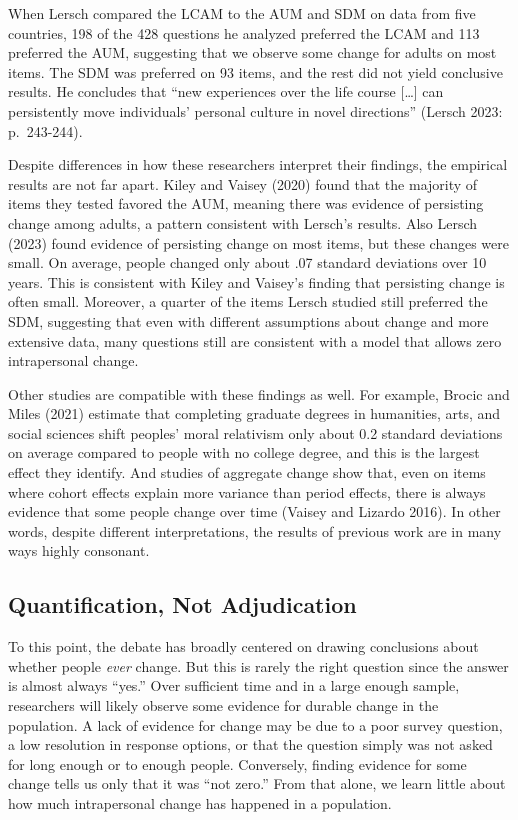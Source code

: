\documentclass[
  12pt,
]{article}
\begin{document}
When Lersch compared the LCAM to the AUM and SDM on data from five
countries, 198 of the 428 questions he analyzed preferred the LCAM and
113 preferred the AUM, suggesting that we observe some change for adults
on most items. The SDM was preferred on 93 items, and the rest did not
yield conclusive results. He concludes that ``new experiences over the
life course {[}\ldots{]} can persistently move individuals' personal
culture in novel directions'' (Lersch 2023: p.~243-244).

Despite differences in how these researchers interpret their findings,
the empirical results are not far apart. Kiley and Vaisey (2020) found
that the majority of items they tested favored the AUM, meaning there
was evidence of persisting change among adults, a pattern consistent
with Lersch's results. Also Lersch (2023) found evidence of persisting
change on most items, but these changes were small. On average, people
changed only about .07 standard deviations over 10 years. This is
consistent with Kiley and Vaisey's finding that persisting change is
often small. Moreover, a quarter of the items Lersch studied still
preferred the SDM, suggesting that even with different assumptions about
change and more extensive data, many questions still are consistent with
a model that allows zero intrapersonal change.

Other studies are compatible with these findings as well. For example,
Brocic and Miles (2021) estimate that completing graduate degrees in
humanities, arts, and social sciences shift peoples' moral relativism
only about 0.2 standard deviations on average compared to people with no
college degree, and this is the largest effect they identify. And
studies of aggregate change show that, even on items where cohort
effects explain more variance than period effects, there is always
evidence that some people change over time (Vaisey and Lizardo 2016). In
other words, despite different interpretations, the results of previous
work are in many ways highly consonant.

\hypertarget{quantification-not-adjudication}{%
\subsection{Quantification, Not
Adjudication}\label{quantification-not-adjudication}}

To this point, the debate has broadly centered on drawing conclusions
about whether people \emph{ever} change. But this is rarely the right
question since the answer is almost always ``yes.'' Over sufficient time
and in a large enough sample, researchers will likely observe some
evidence for durable change in the population. A lack of evidence for
change may be due to a poor survey question, a low resolution in
response options, or that the question simply was not asked for long
enough or to enough people. Conversely, finding evidence for some change
tells us only that it was ``not zero.'' From that alone, we learn little
about how much intrapersonal change has happened in a population.
\end{document}

